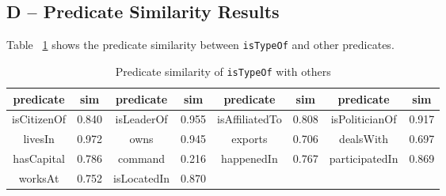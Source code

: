 {
\vspace{-0.8\baselineskip}
\FloatBarrier
\subsection{D -- Predicate Similarity Results}
Table ~\ref{appendix-pred-sim} shows the predicate similarity between {\tt isTypeOf} and other predicates. %
\begin{table}[!htbp]
    \centering
    \vspace{-0.8\baselineskip}
    \scriptsize
    \caption{Predicate similarity of {\tt isTypeOf} with others}
    \vspace{-2\baselineskip}
    \begin{tabular}{ |c|c|c|c|c|c|c|c| }
  \hline
  predicate & sim & predicate & sim & predicate & sim & predicate & sim \\
  \hline
 isCitizenOf &  0.840 &  isLeaderOf &  0.955 & isAffiliatedTo &  0.808 &  isPoliticianOf &  0.917 \\
 livesIn &  0.972 &  owns &  0.945 & exports &  0.706 &  dealsWith &  0.697\\
 hasCapital &  0.786 &  command &  0.216 & happenedIn &  0.767 &  participatedIn &  0.869\\
 worksAt &  0.752 &  isLocatedIn &  0.870 & & & &\\
  \hline
\end{tabular}
\label{appendix-pred-sim}
\end{table}
}
\vspace{-0.8\baselineskip}
\FloatBarrier



